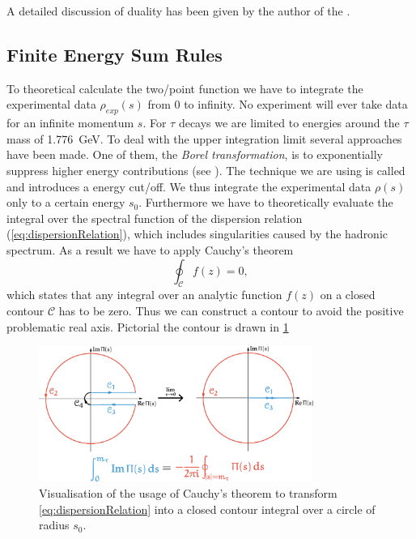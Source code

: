 \documentclass[../../index.tex]{subfiles}
\begin{document}
A detailed discussion of duality has been given by the author of the
\cite{Shifman2000}.


\subsection{Finite Energy Sum Rules}
To theoretical calculate the two\-/point function we have to integrate the
experimental data \(\rho_{exp}(s)\) from 0 to infinity. No experiment will ever
take data for an infinite momentum \(s\). For \(\tau\) decays we are limited to
energies around the \(\tau\) mass of \SI{1.776}{\giga\eV}. To deal with the
upper integration limit several approaches have been made. One of them, the
\textit{Borel transformation}, is to exponentially suppress higher energy
contributions (see \cite{Weinberg1996,Rafael1997}). The technique we are using
is called  and introduces a energy
cut\-/off. We thus integrate the experimental data \(\rho(s)\) only to a certain
energy \(s_0\). Furthermore we have to theoretically evaluate the integral over
the spectral function of the dispersion relation (\cref{eq:dispersionRelation}),
which includes singularities caused by the hadronic spectrum. As a result
we have to apply Cauchy's theorem
\begin{equation}
  \oint_{\mathcal{C}} f(z) = 0,
\end{equation}
which states that any integral over an analytic function \(f(z)\) on a closed
contour \(\mathcal{C}\) has to be zero. Thus we can construct a contour to avoid
the positive problematic real axis. Pictorial the contour is drawn in
\cref{fig:theoreticalTwoPointFunction}
\begin{figure}
  \centering
  \includegraphics[width=0.8\textwidth]{./images/rTauCauchysTheorem.eps}
  \caption{Visualisation of the usage of Cauchy's theorem to transform
    \cref{eq:dispersionRelation} into a closed contour integral over a circle of
    radius $s_0$.}
  \label{fig:theoreticalTwoPointFunction}
\end{figure}
\end{document}
